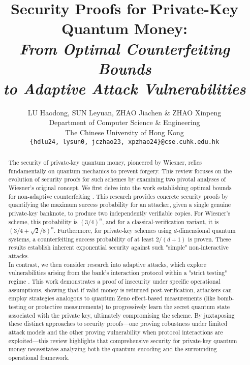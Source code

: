 \documentclass{article} %
\title{Security Proofs for Private-Key Quantum Money:\\
\textit{From Optimal Counterfeiting Bounds \\
to Adaptive Attack Vulnerabilities}}
\author{LU Haodong, SUN Leyuan, ZHAO Jiachen \& ZHAO Xinpeng 
\\
Department of Computer Science \& Engineering\\
The Chinese University of Hong Kong\\
\texttt{\{hdlu24, lysun0, jczhao23, xpzhao24\}@cse.cuhk.edu.hk} 
}
\begin{document}
\maketitle
\begin{abstract}
The security of private-key quantum money, pioneered by Wiesner, relies fundamentally on quantum mechanics to prevent forgery. This review focuses on the evolution of security proofs for such schemes by examining two pivotal analyses of Wiesner's original concept. We first delve into the work establishing optimal bounds for non-adaptive counterfeiting \citep{Molina2012Optimal}. This research provides concrete security proofs by quantifying the maximum success probability for an attacker, given a single genuine private-key banknote, to produce two independently verifiable copies. For Wiesner's scheme, this probability is $(3/4)^n$, and for a classical-verification variant, it is $(3/4 + \sqrt{2}/8)^n$. Furthermore, for private-key schemes using $d$-dimensional quantum systems, a counterfeiting success probability of at least $2/(d+1)$ is proven. These results establish inherent exponential security against such "simple" non-interactive attacks.
\\ In contrast, we then consider research into adaptive attacks, which explore vulnerabilities arising from the bank's interaction protocol within a "strict testing" regime \citep{Nagaj2016Adaptive}. This work demonstrates a proof of insecurity under specific operational assumptions, showing that if valid money is returned post-verification, attackers can employ strategies analogous to quantum Zeno effect-based measurements (like bomb-testing or protective measurements) to progressively learn the secret quantum state associated with the private key, ultimately compromising the scheme. By juxtaposing these distinct approaches to security proofs—one proving robustness under limited attack models and the other proving vulnerability when protocol interactions are exploited—this review highlights that comprehensive security for private-key quantum money necessitates analyzing both the quantum encoding and the surrounding operational framework.
\end{abstract}
\end{document}
